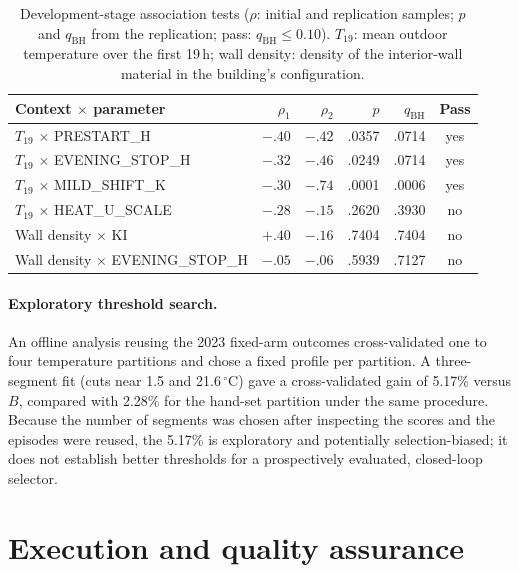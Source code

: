 \begin{table}[!htbp]
\centering
\setlength{\tabcolsep}{4pt}
\caption{Development-stage association tests ($\rho$: initial and replication samples; $p$ and $q_{\mathrm{BH}}$ from the
replication; pass: $q_{\mathrm{BH}} \le 0.10$). $T_{19}$: mean outdoor temperature over the first 19\,h; wall density: density
of the interior-wall material in the building's configuration.}
\label{tab:assoc}
\footnotesize
\begin{tabular}{lrrrrc}
\toprule
Context $\times$ parameter & $\rho_1$ & $\rho_2$ & $p$ & $q_{\mathrm{BH}}$ & Pass\\
\midrule
$T_{19}$ $\times$ PRESTART\_H        & $-.40$ & $-.42$ & .0357 & .0714 & yes\\
$T_{19}$ $\times$ EVENING\_STOP\_H   & $-.32$ & $-.46$ & .0249 & .0714 & yes\\
$T_{19}$ $\times$ MILD\_SHIFT\_K     & $-.30$ & $-.74$ & .0001 & .0006 & yes\\
$T_{19}$ $\times$ HEAT\_U\_SCALE     & $-.28$ & $-.15$ & .2620 & .3930 & no\\
Wall density $\times$ KI             & $+.40$ & $-.16$ & .7404 & .7404 & no\\
Wall density $\times$ EVENING\_STOP\_H & $-.05$ & $-.06$ & .5939 & .7127 & no\\
\bottomrule
\end{tabular}
\end{table}

\paragraph{Exploratory threshold search.}
An offline analysis reusing the 2023 fixed-arm outcomes cross-validated one to four temperature partitions and chose a
fixed profile per partition. A three-segment fit (cuts near 1.5 and 21.6\,$^\circ$C) gave a cross-validated gain of
5.17\% versus $B$, compared with 2.28\% for the hand-set partition under the same procedure. Because the number of
segments was chosen after inspecting the scores and the episodes were reused, the 5.17\% is exploratory and potentially
selection-biased; it does not establish better thresholds for a prospectively evaluated, closed-loop selector.

\section{Execution and quality assurance}\label{app:execution}
